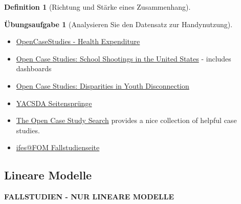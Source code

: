 \documentclass[
  a4paper,
  DIV=11]{scrreprt}
\theoremstyle{definition}
\newtheorem{exercise}{Übungsaufgabe}[chapter]
\theoremstyle{definition}
\theoremstyle{definition}
\newtheorem{definition}{Definition}[chapter]
\theoremstyle{remark}
\begin{document}
\begin{definition}[Richtung und Stärke eines
Zusammenhang]
\begin{exercise}[Analysieren Sie den Datensatz zur
Handynutzung]
\begin{itemize}
  \href{https://data-se.netlify.app/2021/11/27/analyse-der-rki-coronadaten/}{Analyse
  einiger RKI-Coronadaten: Eine reproduzierbare Fallstudie}
\item
  \href{https://www.opencasestudies.org/casestudies/ocs-healthexpenditure.html}{OpenCaseStudies
  - Health Expenditure}
\item
  \href{https://www.opencasestudies.org/ocs-bp-school-shootings-dashboard/\#Motivation}{Open
  Case Studies: School Shootings in the United States} - includes
  dashboards
\item
  \href{https://www.opencasestudies.org/ocs-bp-youth-disconnection/}{Open
  Case Studies: Disparities in Youth Disconnection}
\item
  \href{https://data-se.netlify.app/2021/05/28/yacsda-seitenspr\%C3\%BCnge/}{YACSDA
  Seitensprünge}
\item
  \href{https://www.opencasestudies.org/}{The Open Case Study Search}
  provides a nice collection of helpful case studies.
\item
  \href{https://fallstudien.netlify.app/}{ifes@FOM Fallstudienseite}
\end{itemize}

\subsection{Lineare Modelle}\label{lineare-modelle}

\textbf{FALLSTUDIEN - NUR LINEARE MODELLE}


\end{exercise}
\end{definition}
\end{document}
